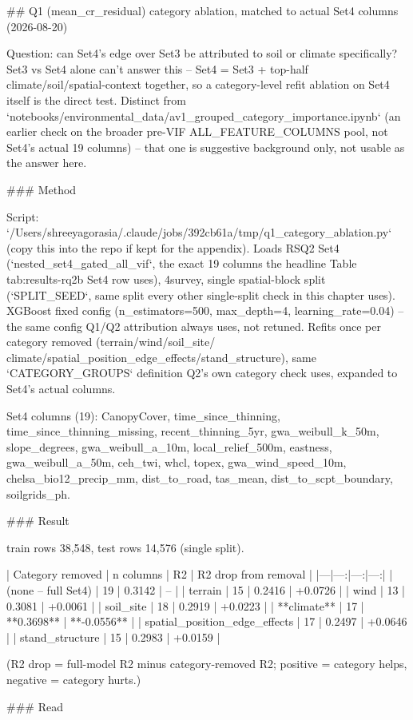 ## Q1 (mean_cr_residual) category ablation, matched to actual Set4 columns (2026-08-20)

Question: can Set4's edge over Set3 be attributed to soil or climate specifically? Set3 vs Set4
alone can't answer this -- Set4 = Set3 + top-half climate/soil/spatial-context together, so a
category-level refit ablation on Set4 itself is the direct test. Distinct from
`notebooks/environmental_data/av1_grouped_category_importance.ipynb` (an earlier check on the
broader pre-VIF ALL_FEATURE_COLUMNS pool, not Set4's actual 19 columns) -- that one is
suggestive background only, not usable as the answer here.

### Method

Script: `/Users/shreeyagorasia/.claude/jobs/392cb61a/tmp/q1_category_ablation.py` (copy this
into the repo if kept for the appendix). Loads RSQ2 Set4 (`nested_set4_gated_all_vif`, the exact
19 columns the headline Table tab:results-rq2b Set4 row uses), 4survey, single spatial-block
split (`SPLIT_SEED`, same split every other single-split check in this chapter uses). XGBoost
fixed config (n_estimators=500, max_depth=4, learning_rate=0.04) -- the same config Q1/Q2
attribution always uses, not retuned. Refits once per category removed (terrain/wind/soil_site/
climate/spatial_position_edge_effects/stand_structure), same `CATEGORY_GROUPS` definition Q2's
own category check uses, expanded to Set4's actual columns.

Set4 columns (19): CanopyCover, time_since_thinning, time_since_thinning_missing,
recent_thinning_5yr, gwa_weibull_k_50m, slope_degrees, gwa_weibull_a_10m, local_relief_500m,
eastness, gwa_weibull_a_50m, ceh_twi, whcl, topex, gwa_wind_speed_10m, chelsa_bio12_precip_mm,
dist_to_road, tas_mean, dist_to_scpt_boundary, soilgrids_ph.

### Result

train rows 38,548, test rows 14,576 (single split).

| Category removed | n columns | R2 | R2 drop from removal |
|---|---:|---:|---:|
| (none -- full Set4) | 19 | 0.3142 | -- |
| terrain | 15 | 0.2416 | +0.0726 |
| wind | 13 | 0.3081 | +0.0061 |
| soil_site | 18 | 0.2919 | +0.0223 |
| **climate** | 17 | **0.3698** | **-0.0556** |
| spatial_position_edge_effects | 17 | 0.2497 | +0.0646 |
| stand_structure | 15 | 0.2983 | +0.0159 |

(R2 drop = full-model R2 minus category-removed R2; positive = category helps, negative = category hurts.)

### Read

